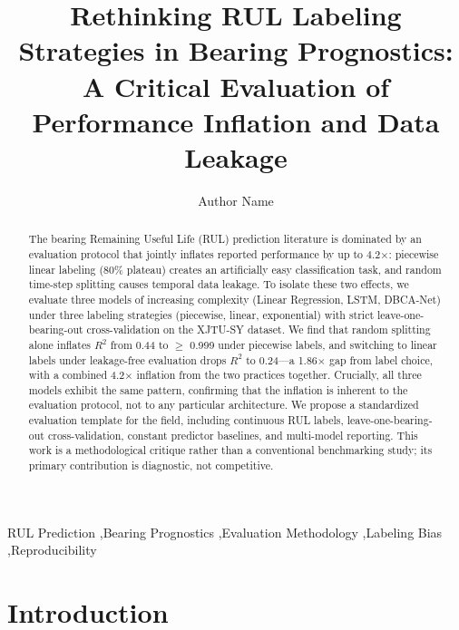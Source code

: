 \documentclass[5p,twocolumn]{elsarticle}
\begin{document}
\begin{frontmatter}

\title{Rethinking RUL Labeling Strategies in Bearing Prognostics: A Critical Evaluation of Performance Inflation and Data Leakage}

\author[1]{Author Name}
\address[1]{School of Mechanical Engineering, University, City, Country}

\begin{abstract}
The bearing Remaining Useful Life (RUL) prediction literature is dominated by an evaluation protocol that jointly inflates reported performance by up to 4.2$\times$: piecewise linear labeling (80\% plateau) creates an artificially easy classification task, and random time-step splitting causes temporal data leakage. To isolate these two effects, we evaluate three models of increasing complexity (Linear Regression, LSTM, DBCA-Net) under three labeling strategies (piecewise, linear, exponential) with strict leave-one-bearing-out cross-validation on the XJTU-SY dataset. We find that random splitting alone inflates $R^2$ from 0.44 to $\geq$ 0.999 under piecewise labels, and switching to linear labels under leakage-free evaluation drops $R^2$ to 0.24---a 1.86$\times$ gap from label choice, with a combined 4.2$\times$ inflation from the two practices together. Crucially, all three models exhibit the same pattern, confirming that the inflation is inherent to the evaluation protocol, not to any particular architecture. We propose a standardized evaluation template for the field, including continuous RUL labels, leave-one-bearing-out cross-validation, constant predictor baselines, and multi-model reporting. This work is a methodological critique rather than a conventional benchmarking study; its primary contribution is diagnostic, not competitive.
\end{abstract}

\begin{keyword}
RUL Prediction \sep Bearing Prognostics \sep Evaluation Methodology \sep Labeling Bias \sep Reproducibility
\end{keyword}

\end{frontmatter}


\section{Introduction}
\label{sec:intro}
\end{document}
